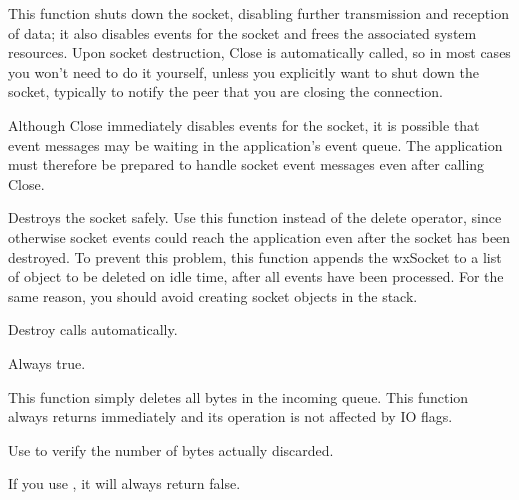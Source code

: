 %
%
\label{wxsocketbaseclose}


This function shuts down the socket, disabling further transmission and
reception of data; it also disables events for the socket and frees the
associated system resources. Upon socket destruction, Close is automatically
called, so in most cases you won't need to do it yourself, unless you
explicitly want to shut down the socket, typically to notify the peer
that you are closing the connection.


Although Close immediately disables events for the socket, it is possible
that event messages may be waiting in the application's event queue. The
application must therefore be prepared to handle socket event messages
even after calling Close.

%
%
\label{wxsocketbasedestroy}


Destroys the socket safely. Use this function instead of the delete operator,
since otherwise socket events could reach the application even after the
socket has been destroyed. To prevent this problem, this function appends
the wxSocket to a list of object to be deleted on idle time, after all
events have been processed. For the same reason, you should avoid creating
socket objects in the stack.

Destroy calls  automatically.


Always true.

%
%
\label{wxsocketbasediscard}


This function simply deletes all bytes in the incoming queue. This function
always returns immediately and its operation is not affected by IO flags.

Use  to verify the number of bytes actually discarded.

If you use , it will always return false.

%
%
\label{wxsocketbaseerror}


